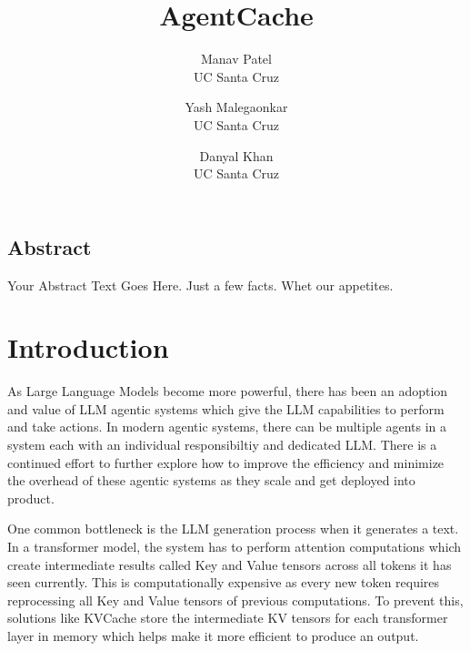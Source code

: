 \documentclass[letterpaper,twocolumn,10pt]{article}
\begin{document}
\date{}

\title{\Large \bf AgentCache}

\author{
{\rm Manav Patel}\\
UC Santa Cruz
\and
{\rm Yash Malegaonkar}\\
UC Santa Cruz
\and
{\rm Danyal Khan}\\
UC Santa Cruz
}

\maketitle

\thispagestyle{empty}


\subsection*{Abstract}
Your Abstract Text Goes Here.  Just a few facts.
Whet our appetites.

\section{Introduction}
As Large Language Models become more powerful, there has been an adoption and value of LLM agentic systems which give the LLM capabilities to perform and take actions. In modern agentic systems, there can be multiple agents in a system each with an individual responsibiltiy and dedicated LLM. There is a continued effort to further explore how to improve the efficiency and minimize the overhead of these agentic systems as they scale and get deployed into product.

One common bottleneck is the LLM generation process when it generates a text. In a transformer model, the system has to perform attention computations which create intermediate results called Key and Value tensors across all tokens it has seen currently. This is computationally expensive as every new token requires reprocessing all Key and Value tensors of previous computations. To prevent this, solutions like KVCache store the intermediate KV tensors for each transformer layer in memory which helps make it more efficient to produce an output.
\end{document}
